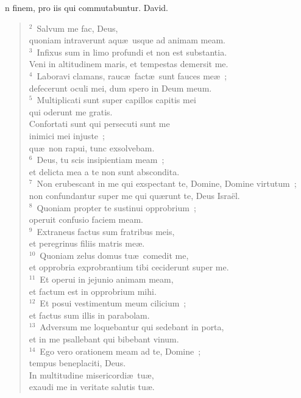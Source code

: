\bchapter[Psalm]
n finem, pro iis qui commutabuntur. David.
\begin{verse}${}^{2}$~Salvum me fac, Deus,\\ quoniam intraverunt aqu\ae\ usque ad animam meam.\\
${}^{3}$~Infixus sum in limo profundi et non est substantia.\\ Veni in altitudinem maris, et tempestas demersit me.\\
${}^{4}$~Laboravi clamans, rauc\ae\ fact\ae\ sunt fauces me\ae~;\\ defecerunt oculi mei, dum spero in Deum meum.\\
${}^{5}$~Multiplicati sunt super capillos capitis mei\\ qui oderunt me gratis.\\ Confortati sunt qui persecuti sunt me\\ inimici mei injuste~;\\ qu\ae\ non rapui, tunc exsolvebam.\\
${}^{6}$~Deus, tu scis insipientiam meam~;\\ et delicta mea a te non sunt abscondita.\\
${}^{7}$~Non erubescant in me qui exspectant te, Domine, Domine virtutum~;\\ non confundantur super me qui qu\ae runt te, Deus Isra\"el.\\
${}^{8}$~Quoniam propter te sustinui opprobrium~;\\ operuit confusio faciem meam.\\
${}^{9}$~Extraneus factus sum fratribus meis,\\ et peregrinus filiis matris me\ae .\\
${}^{10}$~Quoniam zelus domus tu\ae\ comedit me,\\ et opprobria exprobrantium tibi ceciderunt super me.\\
${}^{11}$~Et operui in jejunio animam meam,\\ et factum est in opprobrium mihi.\\
${}^{12}$~Et posui vestimentum meum cilicium~;\\ et factus sum illis in parabolam.\\
${}^{13}$~Adversum me loquebantur qui sedebant in porta,\\ et in me psallebant qui bibebant vinum.\\
${}^{14}$~Ego vero orationem meam ad te, Domine~;\\ tempus beneplaciti, Deus.\\ In multitudine misericordi\ae\ tu\ae ,\\ exaudi me in veritate salutis tu\ae .\\

\end{verse}
